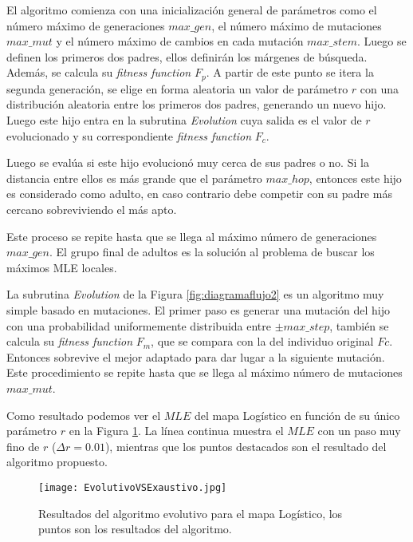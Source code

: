 El algoritmo comienza con una inicialización general de parámetros como el número máximo de generaciones $max\_gen$, el número máximo de mutaciones $max\_mut$ y el número máximo de cambios en cada mutación $max\_stem$.
Luego se definen los primeros dos padres, ellos definirán los márgenes de búsqueda.
Además, se calcula su \textit{fitness function} $F_p$.
A partir de este punto se itera la segunda generación, se elige en forma aleatoria un valor de parámetro $r$ con una distribución aleatoria entre los primeros dos padres, generando un nuevo hijo.
Luego este hijo entra en la subrutina \textit{Evolution} cuya salida es el valor de $r$ evolucionado y su correspondiente \textit{fitness function} $F_c$.

Luego se evalúa si este hijo evolucionó muy cerca de sus padres o no.
Si la distancia entre ellos es más grande que el parámetro $max\_hop$, entonces este hijo es considerado como adulto, en caso contrario debe competir con su padre más cercano sobreviviendo el más apto.

Este proceso se repite hasta que se llega al máximo número de  generaciones $max\_gen$.
El grupo final de adultos es la solución al problema de buscar los máximos MLE locales.

La subrutina \textit{Evolution} de la Figura \ref{fig:diagramaflujo2} es un algoritmo muy simple basado en mutaciones.
El primer paso es generar una mutación del hijo con una probabilidad uniformemente distribuida entre $\pm max\_step$, también se calcula su \textit{fitness function} $F_m$, que se compara con la del individuo original $Fc$.
Entonces sobrevive el mejor adaptado para dar lugar a la siguiente mutación.
Este procedimiento se repite hasta que se llega al máximo número de mutaciones $max\_mut$.

Como resultado podemos ver el $MLE$ del mapa Logístico en función de su único parámetro $r$ en la Figura \ref{fig:resultadoAlgorithm}.
La línea continua muestra el $MLE$ con un paso muy fino de $r$ ($\Delta r = 0.01$), mientras que los puntos destacados son el resultado del algoritmo propuesto.
%
\begin{figure}
	\centering
	\texttt{[image: EvolutivoVSExaustivo.jpg]}\\
	\caption{Resultados del algoritmo evolutivo para el mapa Logístico, los puntos son los resultados del algoritmo.}\label{fig:resultadoAlgorithm}
\end{figure}

